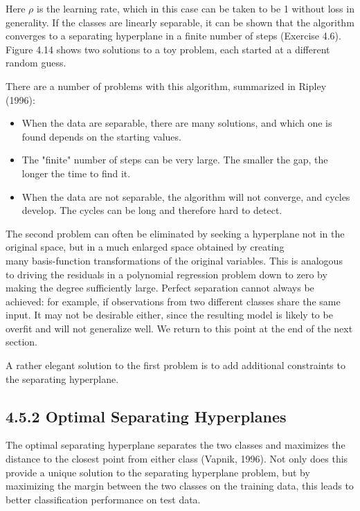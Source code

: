 \documentclass[10pt]{article}
\begin{document}
Here $\rho$ is the learning rate, which in this case can be taken to be 1 without loss in generality. If the classes are linearly separable, it can be shown that the algorithm converges to a separating hyperplane in a finite number of steps (Exercise 4.6). Figure 4.14 shows two solutions to a toy problem, each started at a different random guess.

There are a number of problems with this algorithm, summarized in Ripley (1996):

\begin{itemize}
  \item When the data are separable, there are many solutions, and which one is found depends on the starting values.
  \item The "finite" number of steps can be very large. The smaller the gap, the longer the time to find it.
  \item When the data are not separable, the algorithm will not converge, and cycles develop. The cycles can be long and therefore hard to detect.
\end{itemize}

The second problem can often be eliminated by seeking a hyperplane not in the original space, but in a much enlarged space obtained by creating\\
many basis-function transformations of the original variables. This is analogous to driving the residuals in a polynomial regression problem down to zero by making the degree sufficiently large. Perfect separation cannot always be achieved: for example, if observations from two different classes share the same input. It may not be desirable either, since the resulting model is likely to be overfit and will not generalize well. We return to this point at the end of the next section.

A rather elegant solution to the first problem is to add additional constraints to the separating hyperplane.

\subsection*{4.5.2 Optimal Separating Hyperplanes}
The optimal separating hyperplane separates the two classes and maximizes the distance to the closest point from either class (Vapnik, 1996). Not only does this provide a unique solution to the separating hyperplane problem, but by maximizing the margin between the two classes on the training data, this leads to better classification performance on test data.
\end{document}
